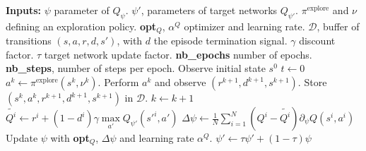 
\begin{algorithmic}
	\STATE \textbf{Inputs:}
	\STATE $\psi$ parameter of
	$Q_\psi$.
	\STATE $\psi'$, parameters of target networks
	$Q_{\psi'}$.
	\STATE $\pi^{\text{explore}}$ and $\nu$ defining an exploration policy.
	\STATE \textbf{opt}$_Q$, $\alpha^Q$ optimizer and learning rate.
	\STATE $\mathcal{D}$, buffer of transitions $(s, a, r, d, s')$, with $d$ the episode termination signal.
	\STATE $\gamma$ discount factor.
	\STATE $\tau$ target network update factor.
	\STATE \textbf{nb\_epochs} number of epochs.
	\STATE \textbf{nb\_steps}, number of steps per epoch.
	\STATE
	\STATE Observe initial state $s^0$
	\STATE $t \gets 0$
	\STATE $a^k \leftarrow \pi^{\text{explore}}(s^k, \nu^k)$.
	\STATE Perform $a^k$ and observe $(r^{k+1}, d^{k+1}, s^{k+1})$.
	\STATE Store $(s^k, a^k, r^{k+1}, d^{k+1}, s^{k+1})$ in $\mathcal{D}$.
	\STATE $k \gets k + 1$
	\ENDFOR
	\STATE {}
	\STATE $\tilde{Q^i} \gets r^i + (1 - d^i) \gamma \max\limits_{a'}Q_{\psi'}(s'^i, a')$
	\STATE $\Delta \psi \gets \frac{1}{N}\sum\limits_{i=1}^N \left(Q^i - \tilde{Q^i}\right) \partial_\psi Q(s^i, a^i)$
	\STATE Update $\psi$ with \textbf{opt}$_Q$, $\Delta \psi$ and learning rate $\alpha^Q$.
	\STATE $\psi' \gets \tau \psi' + (1 - \tau) \psi$
	\ENDFOR
	\ENDFOR
\end{algorithmic}

